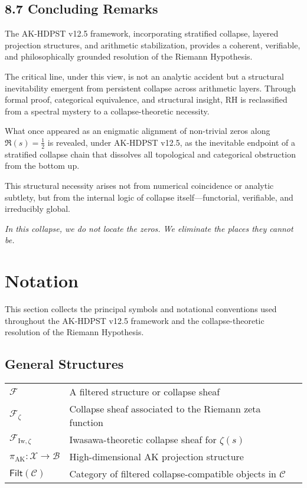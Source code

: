 \documentclass[11pt]{article}
\begin{document}
\subsection*{8.7 Concluding Remarks}

The AK-HDPST v12.5 framework, incorporating stratified collapse, layered projection structures, and arithmetic stabilization, provides a coherent, verifiable, and philosophically grounded resolution of the Riemann Hypothesis.

The critical line, under this view, is not an analytic accident but a structural inevitability emergent from persistent collapse across arithmetic layers. Through formal proof, categorical equivalence, and structural insight, RH is reclassified from a spectral mystery to a collapse-theoretic necessity.

\vspace{1em}

What once appeared as an enigmatic alignment of non-trivial zeros along $\Re(s) = \tfrac{1}{2}$ is revealed, under AK-HDPST v12.5, as the inevitable endpoint of a stratified collapse chain that dissolves all topological and categorical obstruction from the bottom up.

This structural necessity arises not from numerical coincidence or analytic subtlety, but from the internal logic of collapse itself—functorial, verifiable, and irreducibly global.

\vspace{1em}

\textit{In this collapse, we do not locate the zeros.  
We eliminate the places they cannot be.}



\section*{Notation}

This section collects the principal symbols and notational conventions used throughout the AK-HDPST v12.5 framework and the collapse-theoretic resolution of the Riemann Hypothesis.

\subsection*{General Structures}

\begin{tabular}{ll}
$\mathcal{F}$ & A filtered structure or collapse sheaf \\
$\mathcal{F}_{\zeta}$ & Collapse sheaf associated to the Riemann zeta function \\
$\mathcal{F}_{\mathrm{Iw}, \zeta}$ & Iwasawa-theoretic collapse sheaf for $\zeta(s)$ \\
$\pi_{\mathrm{AK}} : \mathcal{X} \to \mathcal{B}$ & High-dimensional AK projection structure \\
$\mathsf{Filt}(\mathcal{C})$ & Category of filtered collapse-compatible objects in $\mathcal{C}$ \\
\end{tabular}
\end{document}
